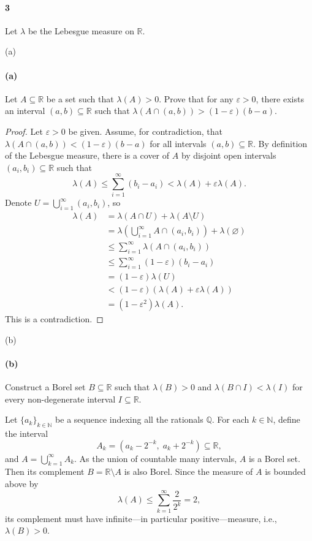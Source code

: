 \documentclass[12pt]{article}
\newlength{\myparskip}
\newenvironment{fullbox}{\begin{lrbox}{\savefullbox}\begin{minipage}{\dimexpr\textwidth-2\fboxsep\relax}\setlength{\parskip}{\myparskip}}{\end{minipage}\end{lrbox}\framebox[\textwidth]{\usebox{\savefullbox}}}
\newenvironment{pbox}[1][]{\begin{fullbox}\ifx#1\empty\else\paragraph{#1}\fi}{\end{fullbox}}
\newcommand{\N}{\mathbb{N}}
\newcommand{\Q}{\mathbb{Q}}
\newcommand{\R}{\mathbb{R}}
\newcommand{\eps}{\varepsilon}
\renewcommand{\emptyset}{\varnothing}
\newcommand{\<}{\langle}
\renewcommand{\>}{\rangle}
\begin{document}
\begin{pbox}[3]
    Let $\lambda$ be the Lebesgue measure on $\R$.
\end{pbox}

\begin{pbox}[(a)]
    Let $A \subseteq \R$ be a set such that $\lambda(A) > 0$. Prove that for any $\eps > 0$, there exists an interval $(a, b) \subseteq \R$ such that $\lambda(A \cap (a, b)) > (1 - \eps)(b - a)$.
\end{pbox}

\begin{proof}
    Let $\eps > 0$ be given. Assume, for contradiction, that $\lambda(A \cap (a, b)) < (1 - \eps)(b - a)$ for all intervals $(a, b) \subseteq \R$. By definition of the Lebesgue measure, there is a cover of $A$ by disjoint open intervals $(a_i, b_i) \subseteq \R$ such that
    \[
        \lambda(A) \leq \sum_{i=1}^{\infty} (b_i - a_i) < \lambda(A) + \eps\lambda(A). 
    \]
    Denote $U = \bigcup_{i=1}^{\infty} (a_i, b_i)$, so
    \begin{align*}
        \lambda(A)
            &= \lambda(A \cap U) + \lambda(A \setminus U) \\
            &= \lambda\left(\bigcup_{i=1}^{\infty} A \cap (a_i, b_i) \right) + \lambda(\emptyset) \\
            &\leq \sum_{i=1}^{\infty} \lambda(A \cap (a_i, b_i)) \\
            &\leq \sum_{i=1}^{\infty} (1 - \eps)(b_i - a_i) \\
            &= (1 - \eps)\lambda(U) \\
            &< (1 - \eps)(\lambda(A) + \eps\lambda(A)) \\
            &= (1 - \eps^2)\lambda(A).
    \end{align*}
    This is a contradiction.

\end{proof}

\begin{pbox}[(b)]
    Construct a Borel set $B \subseteq \R$ such that $\lambda(B) > 0$ and $\lambda(B \cap I) < \lambda(I)$ for every non-degenerate interval $I \subseteq \R$.
\end{pbox}

Let $\{a_k\}_{k\in\N}$ be a sequence indexing all the rationals $\Q$. For each $k \in \N$, define the interval
\[
    A_k = (a_k - 2^{-k},\; a_k + 2^{-k}) \subseteq \R,
\]
and $A = \bigcup_{k=1}^{\infty} A_k$. As the union of countable many intervals, $A$ is a Borel set. Then its complement $B = \R \setminus A$ is also Borel. Since the measure of $A$ is bounded above by
\[
    \lambda(A) \leq \sum_{k=1}^{\infty} \frac{2}{2^k} = 2,
\]
its complement must have infinite---in particular positive---measure, i.e., $\lambda(B) > 0$.
\end{document}
